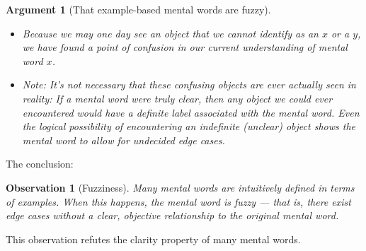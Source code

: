 \documentclass[11pt, oneside]{article}   	%
\newtheorem{obs}{Observation}
\newtheorem{argt}{Argument}
\begin{document}
\begin{argt}[That example-based mental words are fuzzy]
\begin{itemize}
            In short, no matter what the sets $p_x$ and $p_y$ look like, simply
            because they are finite sets of real numbers, there must be some
            non-empty zone of ambiguity. Objects with a $p$ property in the
            ambiguous zone cannot be distinguished based on the learning
            examples.\footnote{In case you have a machine learning background,
            this argument will probably be easier for you to grasp than for
            other readers.
            I'm appealing to the intuition that even when we decide to find a
            simple decision boundary, such as a straight line in a plane, and we
            have data consistent with that decision boundary, we typically do
            not have a {\em uniquely-determined} hypothesis. For example, if
            $p_x=\{1.3, 2.4, 3.7\}$ and $p_y=\{4.1, 5.8\}$, and I see $p=3.9$,
            then I have no definitive
            way to tell if the object is an $x$ or a $y$.}
            This ambiguous zone must exist for all real-valued
            properties of the object by applying the same argument to each
            property.
        \item Because we may one day see an object that we cannot identify as an
            $x$ or a $y$, we have found a point of confusion in our current
            understanding of mental word $x$.
        \item Note: It's not necessary that these confusing objects are ever
            actually seen in reality: If a mental word were truly clear, then
            any
            object we could ever encountered would have a definite label
            associated with the mental word. Even the logical possibility of
            encountering an indefinite (unclear) object shows the mental word to
            allow for undecided edge cases.
    \end{itemize}
\end{argt}

The conclusion:


\begin{obs}[Fuzziness]\label{o7}
    Many mental words are
    intuitively defined in terms of examples. When this
    happens, the mental word is {\em fuzzy} --- that is,
    there exist edge cases without a
    clear, objective relationship to the original mental word.
\end{obs}

This observation refutes the clarity property of many mental words.
\end{document}
